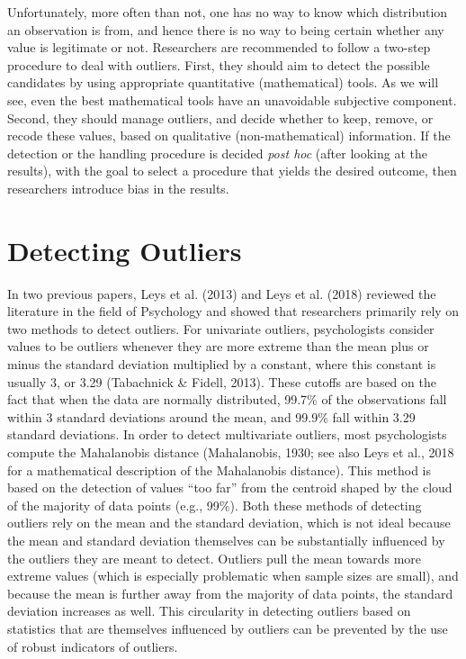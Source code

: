 \documentclass[man,floatsintext]{apa6}
\begin{document}
Unfortunately, more often than not, one has no way to know which distribution an observation is from, and hence there is no way to being certain whether any value is legitimate or not. Researchers are recommended to follow a two-step procedure to deal with outliers. First, they should aim to detect the possible candidates by using appropriate quantitative (mathematical) tools. As we will see, even the best mathematical tools have an unavoidable subjective component. Second, they should manage outliers, and decide whether to keep, remove, or recode these values, based on qualitative (non-mathematical) information. If the detection or the handling procedure is decided \emph{post hoc} (after looking at the results), with the goal to select a procedure that yields the desired outcome, then researchers introduce bias in the results.

\hypertarget{detecting-outliers}{%
\section{Detecting Outliers}\label{detecting-outliers}}

In two previous papers, Leys et al. (2013) and Leys et al. (2018) reviewed the literature in the field of Psychology and showed that researchers primarily rely on two methods to detect outliers. For univariate outliers, psychologists consider values to be outliers whenever they are more extreme than the mean plus or minus the standard deviation multiplied by a constant, where this constant is usually 3, or 3.29 (Tabachnick \& Fidell, 2013). These cutoffs are based on the fact that when the data are normally distributed, 99.7\% of the observations fall within 3 standard deviations around the mean, and 99.9\% fall within 3.29 standard deviations. In order to detect multivariate outliers, most psychologists compute the Mahalanobis distance (Mahalanobis, 1930; see also Leys et al., 2018 for a mathematical description of the Mahalanobis distance). This method is based on the detection of values \enquote{too far} from the centroid shaped by the cloud of the majority of data points (e.g., 99\%). Both these methods of detecting outliers rely on the mean and the standard deviation, which is not ideal because the mean and standard deviation themselves can be substantially influenced by the outliers they are meant to detect. Outliers pull the mean towards more extreme values (which is especially problematic when sample sizes are small), and because the mean is further away from the majority of data points, the standard deviation increases as well. This circularity in detecting outliers based on statistics that are themselves influenced by outliers can be prevented by the use of robust indicators of outliers.
\end{document}
